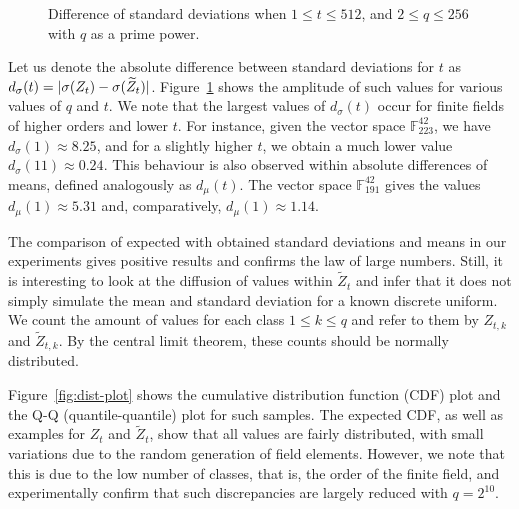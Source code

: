 \documentclass[12pt, a4paper, oneside]{memoir}
\DeclarePairedDelimiter\abs{\lvert}{\rvert}
\theoremstyle{definition}
\begin{document}
\begin{figure}[ht]
  \subfloat[
    $d_{\sigma}(t)$ for $n = 42, v_{1} = 17$.\label{fig:std-diff-n42}
  ]{
  }
  \subfloat[
    $d_{\sigma}(t)$ for $n = 90, v_{1} = 35$.\label{fig:std-diff-n90}
  ]{
  }
  \caption{Difference of standard deviations when $1 \leq t \leq 512$,
    and $2 \leq q \leq 256$ with $q$ as a prime power.}\label{fig:std-diff}
\end{figure}

Let us denote the absolute difference between standard deviations for $t$ as $d_{\sigma}(t) = \abs{\sigma(Z_{t}) - \sigma(\widetilde{Z}_{t})}$. Figure~\ref{fig:std-diff} shows the amplitude of such values for various values of $q$ and $t$. We note that the largest values of $d_{\sigma}(t)$ occur for finite fields of higher orders and lower $t$. For instance, given the vector space $\mathbb{F}_{223}^{42}$, we have $d_{\sigma}(1) \approx 8.25$, and for a slightly higher $t$, we obtain a much lower value $d_{\sigma}(11) \approx 0.24$. This behaviour is also observed within absolute differences of means, defined analogously as $d_{\mu}(t)$. The vector space $\mathbb{F}_{191}^{42}$ gives the values $d_{\mu}(1) \approx 5.31$ and, comparatively, $d_{\mu}(1) \approx 1.14$.

The comparison of expected with obtained standard deviations and means in our experiments gives positive results and confirms the law of large numbers. Still, it is interesting to look at the diffusion of values within $\widetilde{Z}_{t}$ and infer that it does not simply simulate the mean and standard deviation for a known discrete uniform. We count the amount of values for each class $1 \leq k \leq q$ and refer to them by $Z_{t, k}$ and $\widetilde{Z}_{t, k}$. By the central limit theorem, these counts should be normally distributed.

Figure~\ref{fig:dist-plot} shows the cumulative distribution function (CDF) plot and the Q-Q (quantile-quantile) plot for such samples. The expected CDF, as well as examples for $Z_{t}$ and $\widetilde{Z}_{t}$, show that all values are fairly distributed, with small variations due to the random generation of field elements. However, we note that this is due to the low number of classes, that is, the order of the finite field, and experimentally confirm that such discrepancies are largely reduced with $q = 2^{10}$.  
\end{document}
